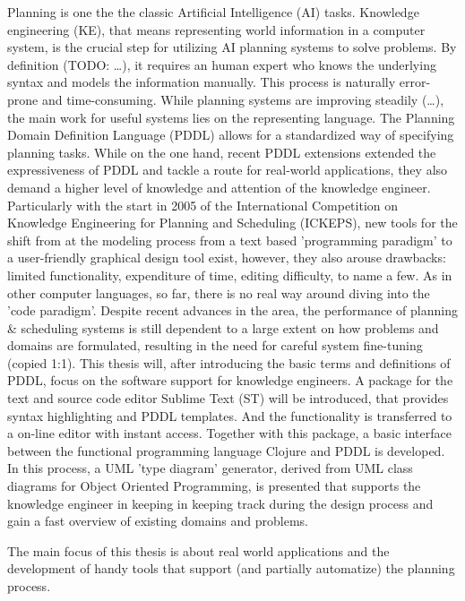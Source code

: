 \documentclass[11pt]{report}
\begin{document}
Planning is one the the classic Artificial Intelligence (AI) tasks.
Knowledge engineering (KE), that means representing world information
in a computer system, is the crucial step for utilizing AI planning
systems to solve problems. By definition (TODO: \ldots{}), it requires an
human expert who knows the underlying syntax and models the
information manually. This process is naturally error-prone and
time-consuming. While planning systems are improving steadily (\ldots{}),
the main work for useful systems lies on the representing language.
The Planning Domain Definition Language (PDDL)
\parencite{mcdermott1998pddl} allows for a standardized way of
specifying planning tasks. While on the one hand, recent PDDL
extensions \parencite{fox2003pddl2,kovacs2011bnf} extended the
expressiveness of PDDL and tackle a route for real-world applications,
they also demand a higher level of knowledge and attention of the
knowledge engineer. Particularly with the start in 2005 of the
International Competition on Knowledge Engineering for Planning and
Scheduling (ICKEPS), new tools for the shift from at the modeling
process from a text based 'programming paradigm' to a user-friendly
graphical design tool exist, however, they also arouse drawbacks:
limited functionality, expenditure of time, editing difficulty, to
name a few. As in other computer languages, so far, there is no real
way around diving into the 'code paradigm'. Despite recent advances in
the area, the performance of planning \& scheduling systems is still
dependent to a large extent on how problems and domains are
formulated, resulting in the need for careful system fine-tuning
(copied 1:1). This thesis will, after introducing the basic terms and
definitions of PDDL, focus on the software support for knowledge
engineers. A package for the text and source code editor Sublime Text
(ST) will be introduced, that provides syntax highlighting and PDDL
templates. And the functionality is transferred to a on-line editor
with instant access. Together with this package, a basic interface
between the functional programming language Clojure and PDDL is
developed. In this process, a UML 'type diagram' generator, derived
from UML class diagrams for Object Oriented Programming, is presented
that supports the knowledge engineer in keeping in keeping track
during the design process and gain a fast overview of existing domains
and problems.

The main focus of this thesis is about real world applications and the
development of handy tools that support (and partially automatize) the
planning process. 
\end{document}
